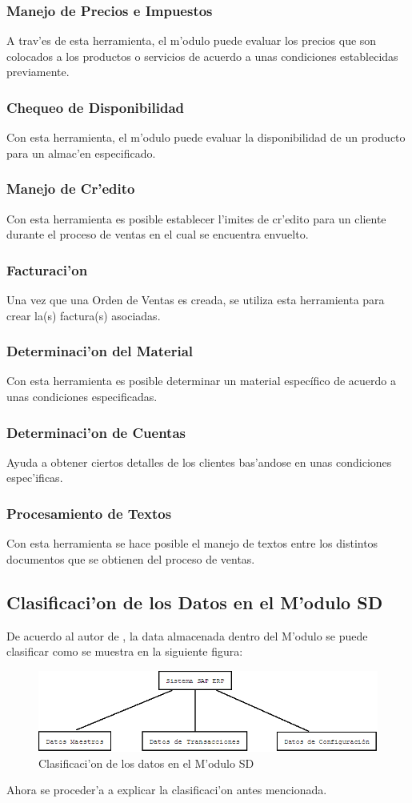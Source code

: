 \subsubsection{Manejo de Precios e Impuestos}
A trav'es de esta herramienta, el m'odulo puede evaluar los precios que son colocados a los productos o servicios de acuerdo a unas condiciones establecidas previamente. 
\subsubsection{Chequeo de Disponibilidad}
Con esta herramienta, el m'odulo puede evaluar la disponibilidad de un producto para un almac'en especificado.
\subsubsection{Manejo de Cr'edito}
Con esta herramienta es posible establecer l'imites de cr'edito para un cliente durante el proceso de ventas en el cual se encuentra envuelto.
\subsubsection{Facturaci'on}
Una vez que una Orden de Ventas es creada, se utiliza esta herramienta para crear la(s) factura(s) asociadas.
\subsubsection{Determinaci'on del Material}
Con esta herramienta es posible determinar un material específico de acuerdo a unas condiciones especificadas.
\subsubsection{Determinaci'on de Cuentas}
Ayuda a obtener ciertos detalles de los clientes bas'andose en unas condiciones espec'ificas.
\subsubsection{Procesamiento de Textos}
Con esta herramienta se hace posible el manejo de textos entre los distintos documentos que se obtienen del proceso de ventas.


\subsection{Clasificaci'on de los Datos en el M'odulo SD}
De acuerdo al autor de \cite{SD01}, la data almacenada dentro del M'odulo se puede clasificar como se muestra en la siguiente figura:
\begin{figure}[htb]
\centering
\includegraphics[scale=0.45,type=png,ext=.png,read=.png]{figures/Clasificacion1}
\caption{Clasificaci'on de los datos en el M'odulo SD}
\label{fig:datasd}
\end{figure}
Ahora se proceder'a a explicar la clasificaci'on antes mencionada.
